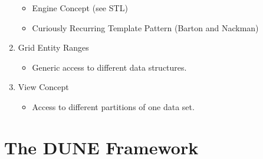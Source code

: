 \documentclass[ignorenonframetext,11pt]{beamer}
\theoremstyle{definition}
\begin{document}
\begin{frame}
\begin{minipage}{0.65\textwidth-1ex}
\begin{enumerate}
\begin{itemize}
        \item Engine Concept (see STL)
        \item Curiously Recurring Template Pattern (Barton and Nackman)
        \end{itemize}
      \item Grid Entity Ranges
        \begin{itemize}
        \item Generic access to different data structures.
        \end{itemize}
      \item View Concept
        \begin{itemize}
        \item Access to different partitions of one data set.
        \end{itemize}
      \end{enumerate}
  \end{minipage}
\end{frame}

\section{The DUNE Framework}
\end{document}
